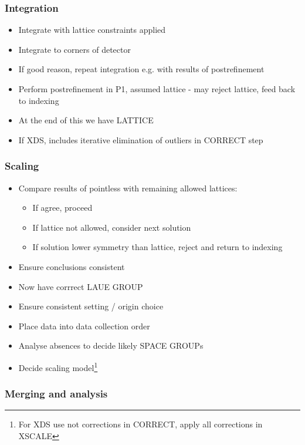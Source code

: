 \documentclass[slides,compress]{beamer}
\begin{document}
\begin{frame}
\frametitle{Integration}
\begin{itemize}
\item{Integrate with lattice constraints applied}
\item{Integrate to corners of detector}
\item{If good reason, repeat integration e.g. with results of postrefinement}
\item{Perform postrefinement in P1, assumed lattice - may reject lattice,
feed back to indexing}
\item{At the end of this we have LATTICE}
\item{If XDS, includes iterative elimination of outliers in CORRECT step}
\end{itemize}
\end{frame}

\begin{frame}
\frametitle{Scaling}
\begin{itemize}
\item{Compare results of pointless with remaining allowed lattices:
\begin{itemize}
\item{If agree, proceed}
\item{If lattice not allowed, consider next solution}
\item{If solution lower symmetry than lattice, reject and return to indexing}
\end{itemize}
}
\item{Ensure conclusions consistent}
\item{Now have corrrect LAUE GROUP}
\item{Ensure consistent setting / origin choice}
\item{Place data into data collection order}
\item{Analyse absences to decide likely SPACE GROUPs}
\item{Decide scaling model\footnote{For XDS use not corrections in CORRECT,
apply all corrections in XSCALE}}
\end{itemize}
\end{frame}

\begin{frame}
\frametitle{Merging and analysis}
\begin{itemize}
\end{itemize}
\end{frame}
\end{document}
